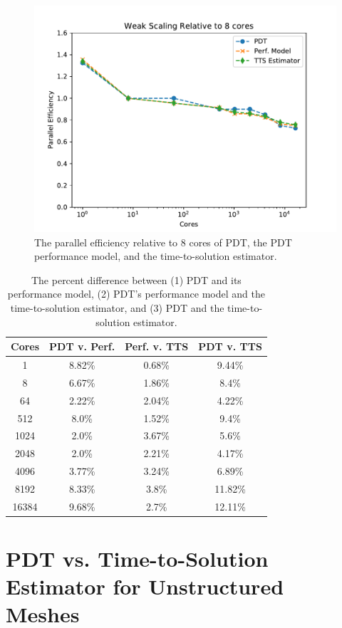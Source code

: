 \begin{figure}[ht]
\centering
\includegraphics[scale=0.8]{../../figures/scaling_tts.pdf}
\caption{The parallel efficiency relative to 8 cores of PDT, the PDT performance model, and the time-to-solution estimator.}
\label{weak_scaling_tts}
\end{figure}
\begin{table}[ht]
\centering
\caption{The percent difference between (1) PDT and its performance model, (2) PDT's performance model and the time-to-solution estimator, and (3) PDT and the time-to-solution estimator.}
\label{scaling_percent_diff}
\begin{tabular}{c|c|c|c}
\textbf{Cores} & \textbf{PDT v. Perf.} & \textbf{Perf. v. TTS} & \textbf{PDT v. TTS} \\ \hline
1&8.82\%&0.68\%&9.44\% \\ \hline
8&6.67\%&1.86\%&8.4\% \\ \hline
64&2.22\%&2.04\%&4.22\% \\ \hline
512&8.0\%&1.52\%&9.4\% \\ \hline
1024&2.0\%&3.67\%&5.6\% \\ \hline
2048&2.0\%&2.21\%&4.17\% \\ \hline
4096&3.77\%&3.24\%&6.89\% \\ \hline
8192&8.33\%&3.8\%&11.82\% \\ \hline
16384&9.68\%&2.7\%&12.11\%
\end{tabular}
\end{table}

\section{PDT vs. Time-to-Solution Estimator for Unstructured Meshes}

